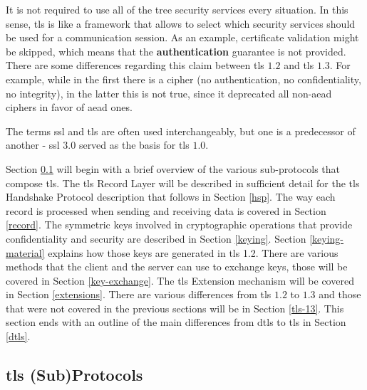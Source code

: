 \documentclass{llncs}
\begin{document}
It is not required to use all of the tree security services every situation.
In this sense, \gls{tls} is like a framework that allows to select which security services should be used for a communication session. As an example,
certificate validation might be skipped, which means that the \textbf{authentication} guarantee is not provided. There are some differences regarding this claim between \gls{tls} $1.2$\cite{RFC5246}
and \gls{tls} $1.3$. For example, while in the first there is a 
cipher (no authentication, no confidentiality, no integrity), in the latter
this is not true, since it deprecated all non-\gls{aead} ciphers in favor of
\gls{aead} ones.

The terms \gls{ssl} and \gls{tls} are often used interchangeably, but one is
a predecessor of another - \gls{ssl} $3.0$\cite{RFC6101} served as the basis
for \gls{tls} $1.0$\cite{RFC6101}.

Section \ref{subprotocols} will begin with a brief overview of the various sub-protocols that compose \gls{tls}. The \gls{tls} Record Layer will
be described in sufficient detail for the \gls{tls} Handshake Protocol
description that follows in Section \ref{hsp}. The way each record is
processed when sending and receiving data is covered in Section \ref{record}.
The symmetric keys involved in cryptographic operations that provide
confidentiality and security are described in Section \ref{keying}. Section
\ref{keying-material} explains how those keys are generated in \gls{tls} 1.2.
There are various methods that the client and the server can use to exchange
keys, those will be covered in Section \ref{key-exchange}. The \gls{tls}
Extension mechanism will be covered in Section \ref{extensions}. There
are various differences from \gls{tls} $1.2$ to $1.3$ and those that were
not covered in the previous sections will be in Section \ref{tls-13}.
This section ends with an outline of the main differences from \gls{dtls} to \gls{tls} in Section \ref{dtls}.


\subsection{\gls{tls} (Sub)Protocols} \label{subprotocols}
\end{document}
